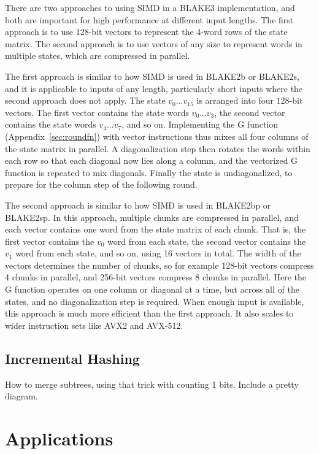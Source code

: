 \documentclass[11pt,notitlepage,a4paper]{article}
\begin{document}
There are two approaches to using SIMD in a BLAKE3 implementation, and both are
important for high performance at different input lengths. The first approach
is to use 128-bit vectors to represent the 4-word rows of the state matrix. The
second approach is to use vectors of any size to represent words in multiple
states, which are compressed in parallel.

The first approach is similar to how SIMD is used in BLAKE2b or BLAKE2s, and it
is applicable to inputs of any length, particularly short inputs where the
second approach does not apply. The state $v_0 \ldots v_{15}$ is arranged into
four 128-bit vectors. The first vector contains the state words $v_0 \ldots
v_3$, the second vector contains the state words $v_4 \ldots v_7$, and so on.
Implementing the G function (Appendix~\ref{sec:roundfn}) with vector
instructions thus mixes all four columns of the state matrix in parallel. A
diagonalization step then rotates the words within each row so that each
diagonal now lies along a column, and the vectorized G function is repeated to
mix diagonals. Finally the state is undiagonalized, to prepare for the column
step of the following round.

The second approach is similar to how SIMD is used in BLAKE2bp or BLAKE2sp. In
this approach, multiple chunks are compressed in parallel, and each vector
contains one word from the state matrix of each chunk. That is, the first
vector contains the $v_0$ word from each state, the second vector contains the
$v_1$ word from each state, and so on, using 16 vectors in total. The width of
the vectors determines the number of chunks, so for example 128-bit vectors
compress 4 chunks in parallel, and 256-bit vectors compress 8 chunks in
parallel. Here the G function operates on one column or diagonal at a time, but
across all of the states, and no diagonalization step is required. When enough
input is available, this approach is much more efficient than the first
approach. It also scales to wider instruction sets like AVX2 and AVX-512.

\subsection{Incremental Hashing}\label{sec:incremental}

How to merge subtrees, using that trick with counting 1 bits. Include a pretty
diagram.

\section{Applications}\label{sec:applications}
\end{document}
